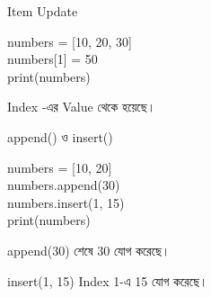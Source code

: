 \begin{codeoutputbox}{Item Update}

\noindent
\begin{minipage}[t]{0.53\linewidth}
\codeheading

\begin{english}
\ttfamily
numbers = [10, 20, 30]\\
numbers[1] = 50\\
print(numbers)
\end{english}

\end{minipage}
\hfill
\begin{minipage}[t]{0.43\linewidth}
\outputheading

\begin{center}
\textenglish{\ttfamily [10, 50, 30]}
\end{center}

Index
\textenglish{}
-এর Value
\textenglish{}
থেকে
\textenglish{}
হয়েছে।

\end{minipage}

\end{codeoutputbox}



\begin{codeoutputbox}{\textenglish{\ttfamily append()} ও \textenglish{\ttfamily insert()}}

\noindent
\begin{minipage}[t]{0.53\linewidth}
\codeheading

\begin{english}
\ttfamily
numbers = [10, 20]\\
numbers.append(30)\\
numbers.insert(1, 15)\\
print(numbers)
\end{english}

\end{minipage}
\hfill
\begin{minipage}[t]{0.43\linewidth}
\outputheading

\begin{center}
\textenglish{\ttfamily [10, 15, 20, 30]}
\end{center}

\textenglish{\ttfamily append(30)}
শেষে 30 যোগ করেছে।

\textenglish{\ttfamily insert(1, 15)}
Index 1-এ 15 যোগ করেছে।

\end{minipage}

\end{codeoutputbox}

